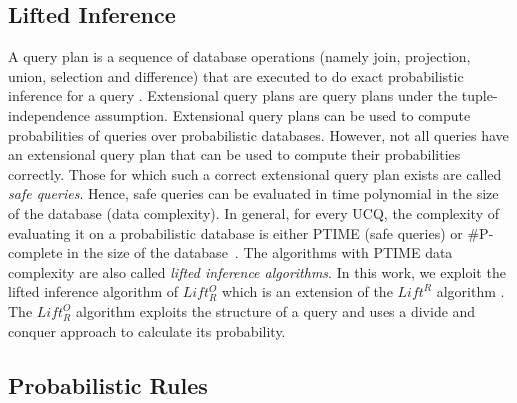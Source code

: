 \documentclass[akbc,twoside,11pt]{article}
\newcommand{\ondrej}[1]{\textcolor{red}{O: {#1}}}
\newcommand{\arcchit}[1]{\textcolor{blue}{A: {#1}}}
\begin{document}
\subsection{Lifted Inference}

A query plan is a sequence of database operations (namely join, projection, union, selection and difference) that are executed to do exact probabilistic inference for a query \cite{DBLP:journals/ftdb/BroeckS17}. %
Extensional query plans are query plans under the tuple-independence assumption. Extensional query plans can be used to compute probabilities of queries over probabilistic databases. However, not all queries have an extensional query plan that can be used to compute their probabilities correctly. Those for which such a correct extensional query plan exists are called {\em safe queries}. Hence, safe queries can be evaluated in time polynomial in the size of the database (data complexity). In general, for every UCQ, the complexity of evaluating it on a probabilistic database is either PTIME (safe queries) or \#P-complete in the size of the database~\cite{dalvi2012dichotomy}. The algorithms with PTIME data complexity are also called {\em lifted inference algorithms}. In this work, we exploit the lifted inference algorithm of $Lift^O_R$ which is an extension of the $\textit{Lift}^R$ algorithm \cite{DBLP:conf/uai/GribkoffBS14}. The $Lift^O_R$ algorithm exploits the structure of a query and uses a divide and conquer approach to calculate its probability.  


\subsection{Probabilistic Rules} \label{sub:probrules}%
\end{document}
